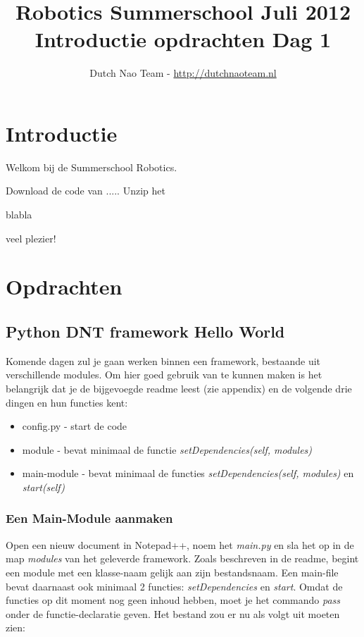 \documentclass[a4paper]{article}
\title{\textbf{Robotics Summerschool Juli 2012} \\ Introductie opdrachten Dag 1}
\author{Dutch Nao Team - \url{http://dutchnaoteam.nl}}
\date{}
\begin{document}
\maketitle

\section{Introductie}
Welkom bij de Summerschool Robotics.

Download de code van .....
Unzip het 

blabla

veel plezier!


\tableofcontents

\newpage


\section{Opdrachten}

\subsection{Python DNT framework Hello World}
Komende dagen zul je gaan werken binnen een framework, bestaande uit verschillende modules. Om hier goed gebruik van te kunnen maken is het belangrijk dat je de bijgevoegde readme leest (zie appendix) en de volgende drie dingen en hun functies kent:
\begin{itemize}
\item config.py - start de code
\item module - bevat minimaal de functie \textit{setDependencies(self, modules)}
\item main-module - bevat minimaal de functies \textit{setDependencies(self, modules)} en \textit{start(self)}
\end{itemize}

\subsubsection{Een Main-Module aanmaken}
Open een nieuw document in Notepad++, noem het \textit{main.py} en sla het op in de map \textit{modules} van het geleverde framework. 
Zoals beschreven in de readme, begint een module met een klasse-naam gelijk aan zijn bestandsnaam. Een main-file bevat daarnaast ook minimaal 2 functies: \textit{setDependencies} en \textit{start}.
Omdat de functies op dit moment nog geen inhoud hebben, moet je het commando \textit{pass} onder de functie-declaratie geven. Het bestand zou er nu als volgt uit moeten zien:
\end{document}
